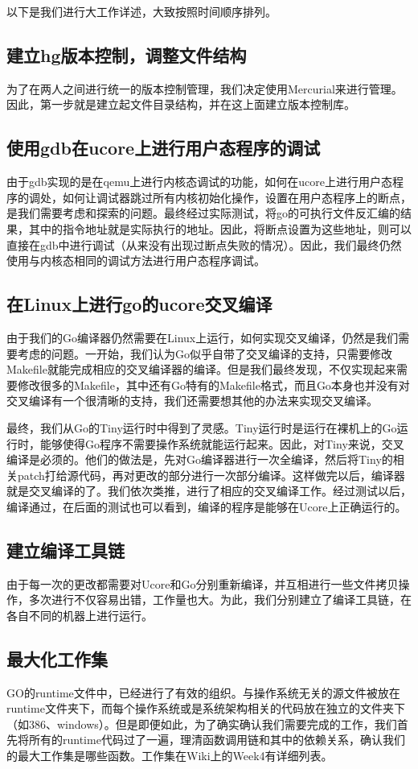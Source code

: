 \documentclass{article}
\begin{document}
以下是我们进行大工作详述，大致按照时间顺序排列。

\subsection{建立hg版本控制，调整文件结构}
为了在两人之间进行统一的版本控制管理，我们决定使用Mercurial来进行管理。因此，第一步就是建立起文件目录结构，并在这上面建立版本控制库。

\subsection{使用gdb在ucore上进行用户态程序的调试}
由于gdb实现的是在qemu上进行内核态调试的功能，如何在ucore上进行用户态程序的调处，如何让调试器跳过所有内核初始化操作，设置在用户态程序上的断点，是我们需要考虑和探索的问题。最终经过实际测试，将go的可执行文件反汇编的结果，其中的指令地址就是实际执行的地址。因此，将断点设置为这些地址，则可以直接在gdb中进行调试（从来没有出现过断点失败的情况）。因此，我们最终仍然使用与内核态相同的调试方法进行用户态程序调试。

\subsection{在Linux上进行go的ucore交叉编译}
由于我们的Go编译器仍然需要在Linux上运行，如何实现交叉编译，仍然是我们需要考虑的问题。一开始，我们认为Go似乎自带了交叉编译的支持，只需要修改Makefile就能完成相应的交叉编译器的编译。但是我们最终发现，不仅实现起来需要修改很多的Makefile，其中还有Go特有的Makefile格式，而且Go本身也并没有对交叉编译有一个很清晰的支持，我们还需要想其他的办法来实现交叉编译。

最终，我们从Go的Tiny运行时中得到了灵感。Tiny运行时是运行在裸机上的Go运行时，能够使得Go程序不需要操作系统就能运行起来。因此，对Tiny来说，交叉编译是必须的。他们的做法是，先对Go编译器进行一次全编译，然后将Tiny的相关patch打给源代码，再对更改的部分进行一次部分编译。这样做完以后，编译器就是交叉编译的了。我们依次类推，进行了相应的交叉编译工作。经过测试以后，编译通过，在后面的测试也可以看到，编译的程序是能够在Ucore上正确运行的。

\subsection{建立编译工具链}
由于每一次的更改都需要对Ucore和Go分别重新编译，并互相进行一些文件拷贝操作，多次进行不仅容易出错，工作量也大。为此，我们分别建立了编译工具链，在各自不同的机器上进行运行。

\subsection{最大化工作集}
GO的runtime文件中，已经进行了有效的组织。与操作系统无关的源文件被放在runtime文件夹下，而每个操作系统或是系统架构相关的代码放在独立的文件夹下（如386、windows）。但是即便如此，为了确实确认我们需要完成的工作，我们首先将所有的runtime代码过了一遍，理清函数调用链和其中的依赖关系，确认我们的最大工作集是哪些函数。工作集在Wiki上的Week4有详细列表。
\end{document}
